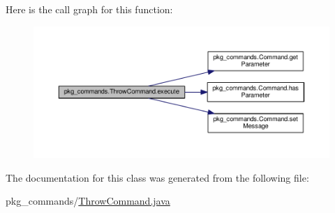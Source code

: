 Here is the call graph for this function\-:
\nopagebreak
\begin{figure}[H]
\begin{center}
\leavevmode
\includegraphics[width=350pt]{classpkg__commands_1_1ThrowCommand_a38d936bcebcf45936324caf0f417b012_cgraph}
\end{center}
\end{figure}




The documentation for this class was generated from the following file\-:\begin{DoxyCompactItemize}
\item 
pkg\-\_\-commands/\hyperlink{ThrowCommand_8java}{Throw\-Command.\-java}\end{DoxyCompactItemize}
